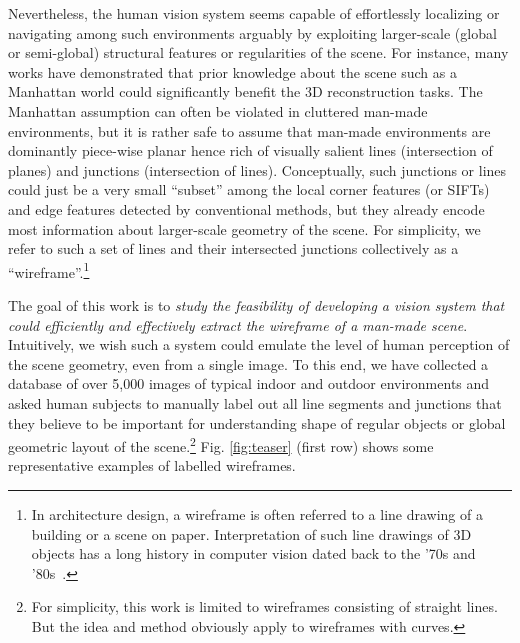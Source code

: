 \documentclass[10pt,twocolumn,letterpaper]{article}
\begin{document}
Nevertheless, the human vision system seems capable of effortlessly localizing or navigating among such environments arguably by exploiting larger-scale (global or semi-global) structural features or regularities of the scene. For instance, many works \cite{DelageLN05, LeeHK09, FurukawaCSS09, FlintMR11, RamalingamPJT13} have demonstrated that prior knowledge about the scene such as a Manhattan world could significantly benefit the 3D reconstruction tasks. The Manhattan assumption can often be violated in cluttered man-made environments, but it is rather safe to assume that man-made environments are dominantly piece-wise planar hence rich of visually salient lines (intersection of planes) and junctions (intersection of lines). Conceptually, such junctions or lines could just be a very small ``subset'' among the local corner features (or SIFTs) and edge features detected by conventional methods, but they already encode most information about larger-scale geometry of the scene. For simplicity, we refer to such a set of lines and their intersected junctions collectively as a ``wireframe''.\footnote{In architecture design, a wireframe is often referred to a line drawing of a building or a scene on paper. Interpretation of such line drawings of 3D objects has a long history in computer vision dated back to the '70s and '80s~\cite{Huffman71, Clowes71, Sugihara82, Malik87}.} 


The goal of this work is to {\em study the feasibility of developing a vision system that could efficiently and effectively extract the wireframe of a man-made scene}. Intuitively, we wish such a system could emulate the level of human perception of the scene geometry, even from a single image. To this end, we have collected a database of over 5,000 images of typical indoor and outdoor environments and asked human subjects to manually label out all line segments and junctions that they believe to be important for understanding shape of regular objects or global geometric layout of the scene.\footnote{For simplicity, this work is limited to wireframes consisting of straight lines. But the idea and method obviously apply to wireframes with curves.} Fig. \ref{fig:teaser} (first row) shows some representative examples of labelled wireframes.
\end{document}
